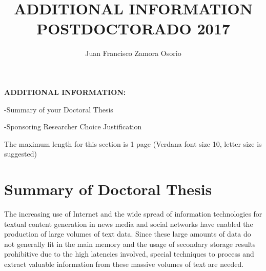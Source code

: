 \documentclass[10pt]{article}
\author{Juan Francisco Zamora Osorio}
\title{ADDITIONAL INFORMATION POSTDOCTORADO 2017}
\begin{document}
\textbf{{\large ADDITIONAL INFORMATION:}}

-Summary of your Doctoral Thesis

-Sponsoring Researcher Choice Justification

The maximum length for this section is 1 page (Verdana font size 10, letter size
is suggested)

\section{Summary of Doctoral Thesis}
The increasing use of Internet and the wide spread of information technologies for textual content generation in news media and social networks have enabled the production of large volumes of text data. Since these large amounts of data do not generally fit in the main memory and the usage of secondary storage results prohibitive due to the high latencies involved, special techniques to process and extract valuable information from these massive volumes of text are needed.
\end{document}
